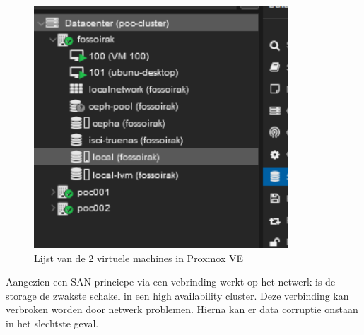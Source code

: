 \begin{figure}[H]
  \centering
  \includegraphics[width=0.85\textwidth]{../poc/vm-lijst-prox.png}
  \caption{Lijst van de 2 virtuele machines in Proxmox VE}
  \label{fig:vm-lijst}
\end{figure}
Aangezien een SAN princiepe via een vebrinding werkt op het netwerk is de storage de zwakste schakel in een high availability cluster. Deze verbinding kan verbroken worden door netwerk problemen. Hierna kan er data corruptie onstaan in het slechtste geval.

